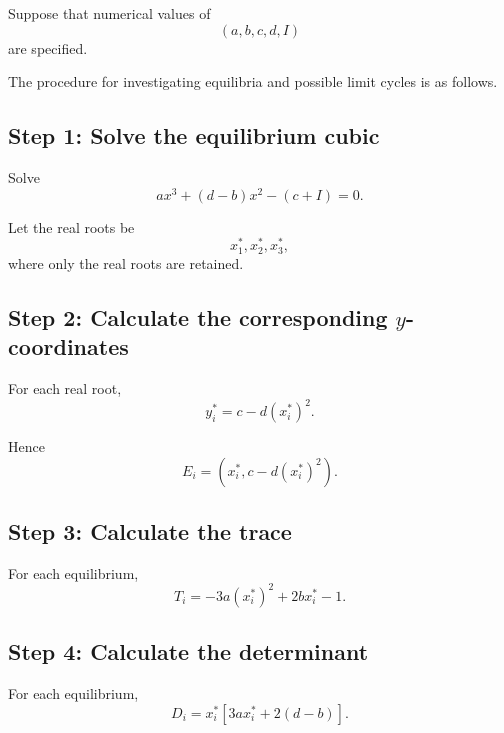 \documentclass[11pt,a4paper]{article}
\begin{document}
Suppose that numerical values of
\begin{equation}
(a,b,c,d,I)
\end{equation}
are specified.

The procedure for investigating equilibria and possible limit cycles
is as follows.

\subsection*{Step 1: Solve the equilibrium cubic}

Solve
\begin{equation}
\boxed{
a x^3+(d-b)x^2-(c+I)=0.
}
\tag{65}
\end{equation}

Let the real roots be
\begin{equation}
x_1^*,x_2^*,x_3^*,
\end{equation}
where only the real roots are retained.

\subsection*{Step 2: Calculate the corresponding $y$-coordinates}

For each real root,
\begin{equation}
\boxed{
y_i^*
=
c-d(x_i^*)^2.
}
\tag{66}
\end{equation}

Hence
\begin{equation}
\boxed{
E_i=
\left(
x_i^*,
c-d(x_i^*)^2
\right).
}
\tag{67}
\end{equation}

\subsection*{Step 3: Calculate the trace}

For each equilibrium,
\begin{equation}
\boxed{
T_i
=
-3a(x_i^*)^2+2bx_i^*-1.
}
\tag{68}
\end{equation}

\subsection*{Step 4: Calculate the determinant}

For each equilibrium,
\begin{equation}
\boxed{
D_i
=
x_i^*
\left[
3ax_i^*+2(d-b)
\right].
}
\tag{69}
\end{equation}
\end{document}
